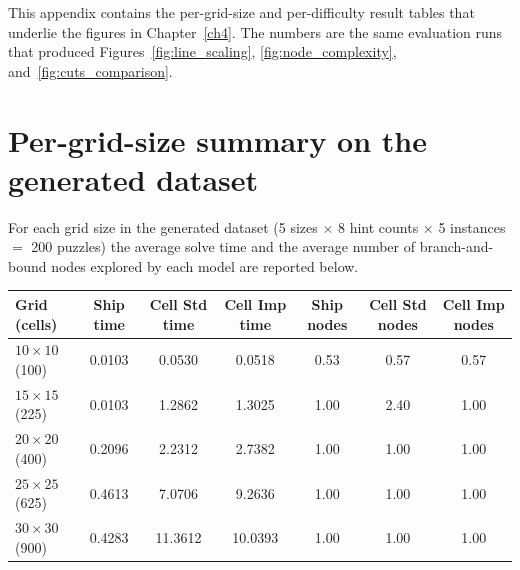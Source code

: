 %

This appendix contains the per-grid-size and per-difficulty result tables that underlie the figures in Chapter~\ref{ch4}. The numbers are the same evaluation runs that produced Figures~\ref{fig:line_scaling}, \ref{fig:node_complexity}, and~\ref{fig:cuts_comparison}.

\section{Per-grid-size summary on the generated dataset}\label{app:per-size}

For each grid size in the generated dataset (5 sizes $\times$ 8 hint counts $\times$ 5 instances $=$ \num{200} puzzles) the average solve time and the average number of branch-and-bound nodes explored by each model are reported below.

\begin{fullwidthtable}[h]
  \centering
  \caption{Average solve time (seconds) and average branch-and-bound nodes explored, on the 200-instance generated dataset, by grid size and solver. ``Cell (Std)'' denotes the baseline Cell Model; ``Cell (Imp.)'' denotes the Improved variant with all four valid inequalities active.}
  \label{tab:appendix-per-size}
  \setlength{\tabcolsep}{4pt}
  \begin{tabular}{lcccccc}
    \toprule
    Grid (cells) & Ship time & Cell Std time & Cell Imp time & Ship nodes & Cell Std nodes & Cell Imp nodes \\
    \midrule
    $10\times10$ (100)  & 0.0103 & 0.0530 & 0.0518 & 0.53 & 0.57 & 0.57 \\
    $15\times15$ (225)  & 0.0103 & 1.2862 & 1.3025 & 1.00 & 2.40 & 1.00 \\
    $20\times20$ (400)  & 0.2096 & 2.2312 & 2.7382 & 1.00 & 1.00 & 1.00 \\
    $25\times25$ (625)  & 0.4613 & 7.0706 & 9.2636 & 1.00 & 1.00 & 1.00 \\
    $30\times30$ (900)  & 0.4283 & 11.3612 & 10.0393 & 1.00 & 1.00 & 1.00 \\
    \bottomrule
  \end{tabular}
\end{fullwidthtable}

